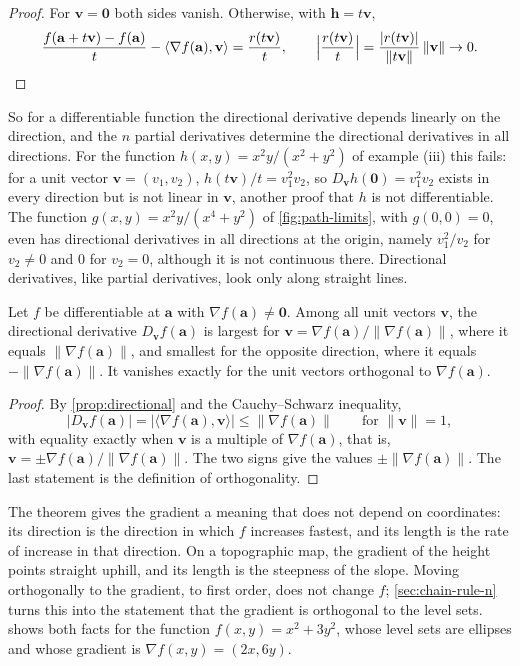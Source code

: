 \begin{proof}
For $\mathbf v=\mathbf0$ both sides vanish. Otherwise, with $\mathbf h=t\mathbf v$,
\[
\frac{f(\mathbf a+t\mathbf v)-f(\mathbf a)}t-\langle\nabla f(\mathbf a),\mathbf v\rangle=\frac{r(t\mathbf v)}t ,\qquad\Bigl|\frac{r(t\mathbf v)}t\Bigr|=\frac{|r(t\mathbf v)|}{\|t\mathbf v\|}\,\|\mathbf v\|\to0 .
\]
\end{proof}

So for a differentiable function the directional derivative depends linearly on the direction, and the $n$ partial derivatives determine the directional derivatives in all directions. For the function $h(x,y)=x^2y/(x^2+y^2)$ of example (iii) this fails: for a unit vector $\mathbf v=(v_1,v_2)$, $h(t\mathbf v)/t=v_1^2v_2$, so $D_{\mathbf v}h(\mathbf0)=v_1^2v_2$ exists in every direction but is not linear in $\mathbf v$, another proof that $h$ is not differentiable. The function $g(x,y)=x^2y/(x^4+y^2)$ of \cref{fig:path-limits}, with $g(0,0)=0$, even has directional derivatives in all directions at the origin, namely $v_1^2/v_2$ for $v_2\ne0$ and $0$ for $v_2=0$, although it is not continuous there. Directional derivatives, like partial derivatives, look only along straight lines.

\begin{theorem}
\label{thm:steepest-ascent}
Let $f$ be differentiable at $\mathbf a$ with $\nabla f(\mathbf a)\ne\mathbf0$. Among all unit vectors $\mathbf v$, the directional derivative $D_{\mathbf v}f(\mathbf a)$ is largest for $\mathbf v=\nabla f(\mathbf a)/\|\nabla f(\mathbf a)\|$, where it equals $\|\nabla f(\mathbf a)\|$, and smallest for the opposite direction, where it equals $-\|\nabla f(\mathbf a)\|$. It vanishes exactly for the unit vectors orthogonal to $\nabla f(\mathbf a)$.
\end{theorem}

\begin{proof}
By \cref{prop:directional} and the Cauchy--Schwarz inequality,
\[
|D_{\mathbf v}f(\mathbf a)|=|\langle\nabla f(\mathbf a),\mathbf v\rangle|\le\|\nabla f(\mathbf a)\|\qquad\text{for }\|\mathbf v\|=1,
\] with equality exactly when $\mathbf v$ is a multiple of $\nabla f(\mathbf a)$, that is, $\mathbf v=\pm\nabla f(\mathbf a)/\|\nabla f(\mathbf a)\|$. The two signs give the values $\pm\|\nabla f(\mathbf a)\|$. The last statement is the definition of orthogonality.
\end{proof}

The theorem gives the gradient a meaning that does not depend on coordinates: its direction is the direction in which $f$ increases fastest, and its length is the rate of increase in that direction. On a topographic map, the gradient of the height points straight uphill, and its length is the steepness of the slope. Moving orthogonally to the gradient, to first order, does not change $f$; \cref{sec:chain-rule-n} turns this into the statement that the gradient is orthogonal to the level sets.  shows both facts for the function $f(x,y)=x^2+3y^2$, whose level sets are ellipses and whose gradient is $\nabla f(x,y)=(2x,6y)$.

